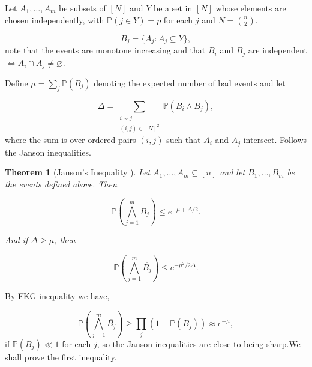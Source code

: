\documentclass[12pt,twoside,a4paper,bibliography=totocnumbered]{book}
\numberwithin{equation}{section}
\let\emptyset=\varnothing
\newtheorem{theorem}             {Theorem}[section]
\theoremstyle{remark}
\begin{document}
Let $A_1, \ldots , A_m$ be subsets of $[N]$ and $Y$ be a set in $[N]$ whose elements are chosen independently, with $\mathbb{P}(j \in Y) = p$ for each $j$ and $N=\binom{n}{2}$. 

$$ B_j = \{A_j \colon A_j \subseteq Y\},$$
note that the events are monotone increasing and that $B_i$ and $B_j$ are independent $\iff A_i \cap A_j \neq \emptyset$. 

Define $\mu = \sum_j \mathbb{P}(B_j)$ denoting the expected number of bad events and let

$$ \Delta = \sum_{\substack{i\sim j\\ (i,j) \in [N]^2}} \mathbb{P}(B_i \wedge B_j), $$
where the sum is over ordered pairs $(i,j)$ such that $A_i$ and $A_j$ intersect. Follows the Janson inequalities.

\begin{theorem}[{Janson's Inequality \cite{Ja87}}]
Let $A_1,\ldots,A_m \subseteq [n]$ and let $B_1,\ldots,B_m$ be the events defined above. Then

$$ \mathbb{P}\left(\bigwedge_{j=1}^m \overline{B_j}\right) \leq e^{-\mu + \Delta/2}. $$

And if $\Delta \geq \mu$, then

$$ \mathbb{P}\left( \bigwedge_{j=1}^m \overline{B_j} \right) \leq e^{-\mu ^2 /2\Delta}.$$
\end{theorem}
By FKG inequality we have,

$$ \mathbb{P}\left( \bigwedge_{j=1}^m \overline{B_j} \right) \geq \prod_j (1-\mathbb{P}(B_j)) \approx e^{-\mu}, $$
if $\mathbb{P}(B_j) \ll 1$ for each $j$, so the Janson inequalities are close to being sharp.We shall prove the first inequality.
\end{document}
